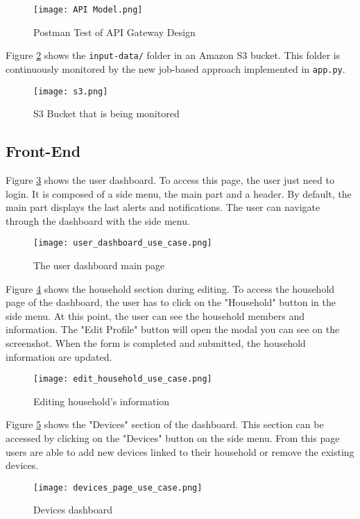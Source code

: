 \documentclass[conference]{IEEEtran}
\begin{document}
\begin{figure}[H]
    \centering
    \texttt{[image: API Model.png]}
    \caption{Postman Test of API Gateway Design}
    \label{fig:postman_api}
\end{figure}

Figure \ref{fig:s3} shows the \texttt{input-data/} folder in an Amazon S3 bucket. This folder is continuously monitored by the new job-based approach implemented in \texttt{app.py}. 

\begin{figure}[H]
    \centering
    \texttt{[image: s3.png]}
    \caption{S3 Bucket that is being monitored}
    \label{fig:s3}
\end{figure}

\subsection{Front-End}

Figure \ref{fig:user_dashboard} shows the user dashboard.
To access this page, the user just need to login. It is composed of a side menu, the main part and a header. By default, the main part displays the last alerts and notifications. The user can navigate through the dashboard with the side menu.

\begin{figure}[H]
    \centering
    \texttt{[image: user\_dashboard\_use\_case.png]}
    \caption{The user dashboard main page}
    \label{fig:user_dashboard}
\end{figure}

Figure \ref{fig:household} shows the household section during editing.
To access the household page of the dashboard, the user has to click on the "Household" button in the side menu. At this point, the user can see the household members and information. The "Edit Profile" button will open the modal you can see on the screenshot.
When the form is completed and submitted, the household information are updated.

\begin{figure}[H]
    \centering
    \texttt{[image: edit\_household\_use\_case.png]}
    \caption{Editing household's information}
    \label{fig:household}
\end{figure}

Figure \ref{fig:devices} shows the "Devices" section of the dashboard.
This section can be accessed by clicking on the "Devices" button on the side menu. From this page users are able to add new devices linked to their household or remove the existing devices.

\begin{figure}[H]
    \centering
    \texttt{[image: devices\_page\_use\_case.png]}
    \caption{Devices dashboard}
    \label{fig:devices}
\end{figure}
\end{document}
